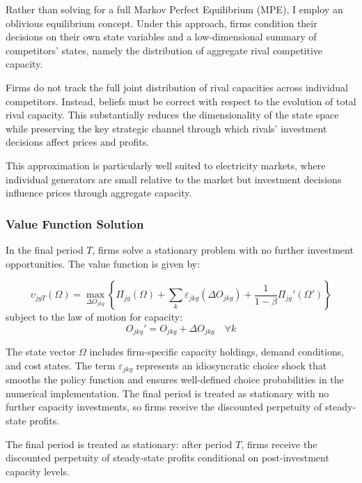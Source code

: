 \documentclass[12pt]{article}
\begin{document}
Rather than solving for a full Markov Perfect Equilibrium (MPE), I employ an oblivious equilibrium concept. Under this approach, firms condition their decisions on their own state variables and a low-dimensional summary of competitors’ states, namely the distribution of aggregate rival competitive capacity.

Firms do not track the full joint distribution of rival capacities across individual competitors. Instead, beliefs must be correct with respect to the evolution of total rival capacity. This substantially reduces the dimensionality of the state space while preserving the key strategic channel through which rivals’ investment decisions affect prices and profits.

This approximation is particularly well suited to electricity markets, where individual generators are small relative to the market but investment decisions influence prices through aggregate capacity.

\subsubsection{Value Function Solution}\label{subsec:value_function}

In the final period $T$, firms solve a stationary problem with no further investment opportunities. The value function is given by:

\begin{equation}\label{eq:value_function}
    \upsilon_{jgT}(\Omega) = \max_{\Delta O_{jkg}} \left\{ \Pi_{jg}(\Omega) + \sum_k \varepsilon_{jkg}(\Delta O_{jkg}) + \frac{1}{1-\beta} \Pi_{jg}'(\Omega') \right\}
\end{equation}
subject to the law of motion for capacity:
\begin{equation}
    O_{jkg}' = O_{jkg} + \Delta O_{jkg} \quad \forall k
\end{equation}

The state vector $\Omega$ includes firm-specific capacity holdings, demand conditions, and cost states. The term $\varepsilon_{jkg}$ represents an idiosyncratic choice shock that smooths the policy function and ensures well-defined choice probabilities in the numerical implementation. The final period is treated as stationary with no further capacity investments, so firms receive the discounted perpetuity of steady-state profits.

The final period is treated as stationary: after period $T$, firms receive the discounted perpetuity of steady-state profits conditional on post-investment capacity levels.
\end{document}
